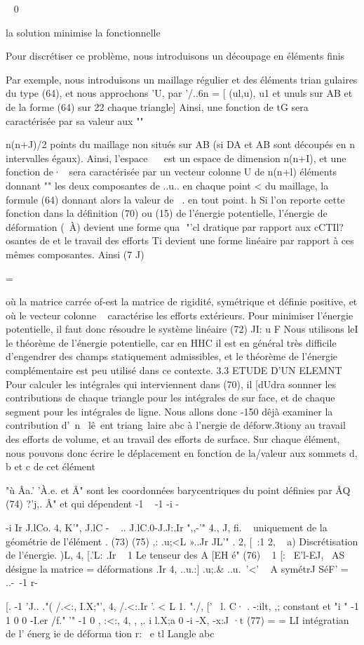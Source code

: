{{{{~ 0 

la solution minimise la fonctionnelle 

Pour discrétiser ce problème, nous introduisons un découpage en éléments finis 

Par exemple, nous introduisons un maillage régulier et des éléments trian
gulaires du type (64), et nous approchons 'U, par '/..6n = [ (ul,u), u1 et unuls sur AB et de la forme (64) sur
22 chaque triangle] 
Ainsi, une fonction de tG sera caractérisée par sa valeur aux 
"" 

n(n+J)/2 points du maillage non situés sur AB (si DA et AB sont découpés en n intervalles égaux). Ainsi, l'espace ~~ est un espace de dimension n(n+I), et une fonction de·~ sera caractérisée par un vecteur colonne 
U de n(n+l) éléments donnant "" les deux composantes de ..u.. en chaque point
<
du maillage, la formule (64) donnant alors la valeur de ~. en tout point.
h 
Si l'on reporte cette fonction dans la définition (70) ou (15) de l'éner­gie potentielle, l'énergie de déformation \V(~À) devient une forme qua
 "'cl
dratique par rapport aux cCTIl?osantes de \! et le travail des efforts Ti 
devient une forme linéaire par rapport à ces mêmes composantes. Ainsi 
(7 J) 

= 

où la matrice carrée of-est la matrice de rigidité, symétrique et définie 
positive, et où le vecteur colonne ~ caractérise les efforts extérieurs. Pour minimiser l'énergie potentielle, il faut donc résoudre le système 
linéaire 
(72) JI: u F 
Nous utilisons leI le théorème de l'énergie potentielle, car en 
HHC il est en général très difficile d'engendrer des champs statiquement 
admissibles, et le théorème de l'énergie complémentaire est peu utilisé dans ce contexte. 
3.3 ETUDE D'UN ELEMNT 
Pour calculer les intégrales qui interviennent dans (70), il [dU­dra sonnner les contributions de chaque triangle pour les intégrales de sur face, et de chaque segment pour les intégrales de ligne. Nous allons donc 
-150 
dêjà examiner la contribution d'~n ~lê~ent triang~laire abc à l'nergie de déforw.3tiony au travail des efforts de volume, et au travail des efforts de surface. 
Sur chaque élément, nous pouvons donc écrire le déplacement en fonction de la/valeur aux sommets d, b et c de cet élément 

"ù Âa.' 'À.e. et Â" sont les coordonnées barycentriques du point 
définies par 
ÂQ 
(74) 
?'j,. 
Â" 
et qui dépendent 
-1 
~ 
-1
-i -{ -i 
Ir
J.lCo. 
4, K'", 
J.lC
-
~ 
.. 
J.lC.0-J.J:.Ir ",,-'" 
4.,
J,
fi. ~ 
uniquement de la géométrie de l'élément . (73) 
(75) ,: 
.u;<L »..Jr JL'" 
. 2,
[~:1 
2, 
~ 
a) Discrétisation de l'énergie. 
)L, 4,
[.'L: .Ir ~ 1 
Le tenseur des 
A
[EH é"
(76) 
~
1 
[:~
E'l-EJ,~ 
AS 
désigne la matrice 
= 
déformations 
.Ir 
4, ..u.:] 
.u;.&
..u.~'<' 
~ 
A symétrJ SéF' 
= 
..-\ -1 
r-{ [. -1 
'J.. 
."( /.<:, I.X;"', 
4, 
/.<:.Ir '. <
L 1. "./, 
[' 
~l. 
C· . -:ilt, ,; constant et 
"i " 
-1 1 
0 0 
-I.er
/f." '" 
-1 0
, :<:, 4, 
,
,. i 
l.X;a 
0 -i
-X, 
-x:J
·t 
(77) 
= 
= LI intégratian de l' énerg ie de déforma tion r: ~e tl Langle abc 


}}}}}}
